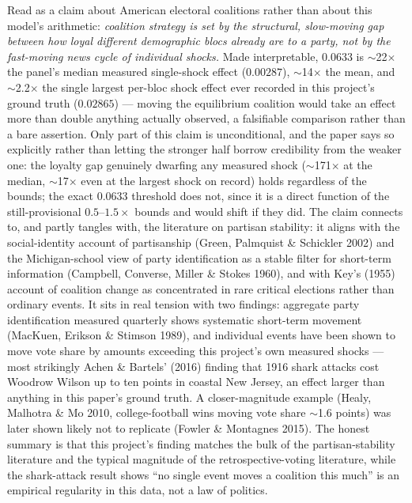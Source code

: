 \documentclass[11pt]{article}
\begin{document}
Read as a claim about American electoral coalitions rather than about this
model's arithmetic: \emph{coalition strategy is set by the structural,
slow-moving gap between how loyal different demographic blocs already are
to a party, not by the fast-moving news cycle of individual shocks.} Made
interpretable, $0.0633$ is $\sim$22$\times$ the panel's median measured
single-shock effect ($0.00287$), $\sim$14$\times$ the mean, and
$\sim$2.2$\times$ the single largest per-bloc shock effect ever recorded in
this project's ground truth ($0.02865$) --- moving the equilibrium coalition
would take an effect more than double anything actually observed, a
falsifiable comparison rather than a bare assertion. Only part of this claim
is unconditional, and the paper says so explicitly rather than letting the
stronger half borrow credibility from the weaker one: the loyalty gap
genuinely dwarfing any measured shock ($\sim$171$\times$ at the median,
$\sim$17$\times$ even at the largest shock on record) holds regardless of
the bounds; the exact $0.0633$ threshold does not, since it is a direct
function of the still-provisional $0.5$--$1.5\times$ bounds and would shift
if they did. The claim connects to, and partly tangles with, the literature
on partisan stability: it aligns with the social-identity account of
partisanship (Green, Palmquist \& Schickler 2002) and the Michigan-school
view of party identification as a stable filter for short-term information
(Campbell, Converse, Miller \& Stokes 1960), and with Key's (1955) account of
coalition change as concentrated in rare critical elections rather than
ordinary events. It sits in real tension with two findings: aggregate party
identification measured quarterly shows systematic short-term movement
(MacKuen, Erikson \& Stimson 1989), and individual events have been shown to
move vote share by amounts exceeding this project's own measured shocks ---
most strikingly Achen \& Bartels' (2016) finding that 1916 shark attacks cost
Woodrow Wilson up to ten points in coastal New Jersey, an effect larger than
anything in this paper's ground truth. A closer-magnitude example (Healy,
Malhotra \& Mo 2010, college-football wins moving vote share $\sim$1.6
points) was later shown likely not to replicate (Fowler \& Montagnes 2015).
The honest summary is that this project's finding matches the bulk of the
partisan-stability literature and the typical magnitude of the
retrospective-voting literature, while the shark-attack result shows ``no
single event moves a coalition this much'' is an empirical regularity in
this data, not a law of politics.
\end{document}

